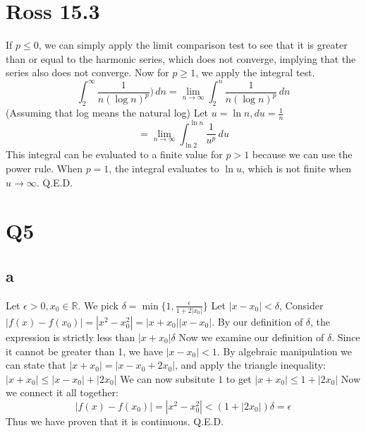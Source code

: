 \documentclass[12pt]{article}
\newcommand{\R}{\mathbb{R}}
\begin{document}
\section{Ross 15.3}
If $p\leq0$, we can simply apply the limit comparison test to see that it is greater than or equal to the harmonic series, which does not converge, implying that the series also does not converge.
\newline
Now for $p \geq 1$, we apply the integral test.
$$\int_{2}^{\infty}\frac{1}{n(\log n)^p}) \,dn = \lim _{n \to \infty} \int_{2}^{n}\frac{1}{n(\log n)^p} \,dn$$
(Assuming that log means the natural log) Let $u = \ln n, du = \frac{1}{n}$
$$= \lim _{n \to \infty} \int_{\ln 2}^{\ln n} \frac{1}{u^p} \,du$$
This integral can be evaluated to a finite value for $p>1$ because we can use the power rule. When $p = 1$, the integral evaluates to $\ln u$, which is not finite when $u \to \infty$.
\newline
Q.E.D.
\newpage


\section{Q5}
\subsection{a}
Let $\epsilon > 0, x_0 \in \R$. We pick $\delta = \min \{1, \frac{\epsilon}{1+2|x_0|}\}$
\newline
Let $|x-x_0|<\delta$, Consider $|f(x)-f(x_0)| = |x^2-x_0^2| = |x+x_0||x-x_0|$. By our definition of $\delta$, the expression is strictly less than $|x+x_0|\delta$
\newline
Now we examine our definition of $\delta$. Since it cannot be greater than 1, we have $|x-x_0|<1$. By algebraic manipulation we can state that $|x+x_0|=|x-x_0+2x_0|$, and apply the triangle inequality: $|x+x_0|\leq |x-x_0|+|2x_0|$
\newline
We can now subsitute $1$ to get $|x+x_0|\leq 1+|2x_0|$
\newline
Now we connect it all together:
$$|f(x)-f(x_0)| = |x^2-x_0^2| < (1+|2x_0|)\delta = \epsilon$$
Thus we have proven that it is continuous.
\newline
Q.E.D.
\end{document}
